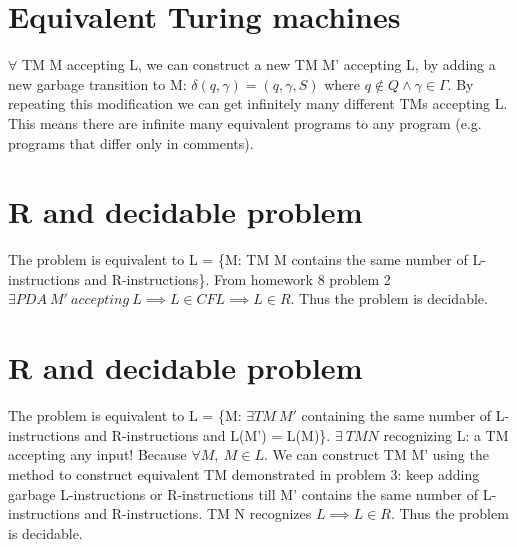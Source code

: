 \documentclass{article}
\begin{document}
\section{Equivalent Turing machines}
$\forall$ TM M accepting L, we can construct a new TM M' accepting L, by adding
a new garbage transition to M: $\delta(q, \gamma) = (q, \gamma, S)$ where $q
\notin Q \land \gamma \in \Gamma$. By repeating this modification we can get
infinitely many different TMs accepting L. This means there are infinite many
equivalent programs to any program (e.g. programs that differ only in comments).

\section{R and decidable problem}
The problem is equivalent to L = \{M: TM M contains the same number of
L-instructions and R-instructions\}. From homework 8 problem 2 $\exists PDA \ M'
\ accepting \ L \implies L \in CFL \implies L \in R$. Thus the problem is
decidable.

\section{R and decidable problem}
The problem is equivalent to L = \{M: $\exists TM \ M'$ containing the same
number of L-instructions and R-instructions and L(M') = L(M)\}. $\exists \ TM N$
recognizing L: a TM accepting any input! Because $\forall M, \ M \in L$. We can
construct TM M' using the method to construct equivalent TM demonstrated in
problem 3: keep adding garbage L-instructions or R-instructions till M' contains
the same number of L-instructions and R-instructions. TM N recognizes $L
\implies L \in R$. Thus the problem is decidable.
\end{document}
